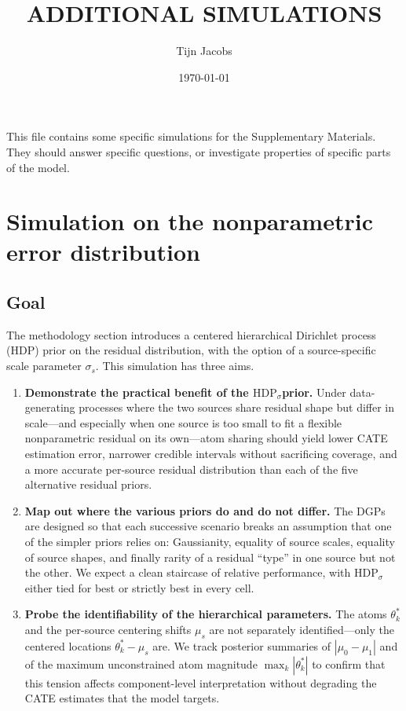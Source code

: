 \documentclass[11pt]{article}
\title{ADDITIONAL SIMULATIONS}
\author{
  Tijn Jacobs}
\date{\today}
\theoremstyle{plain}
\theoremstyle{definition}
\theoremstyle{remark}
\newcommand{\1}{\mathds{1}}
\newcommand{\mHDPs}{\ensuremath{\mathrm{HDP}_\sigma}}
\begin{document}
\maketitle

This file contains some specific simulations for the Supplementary Materials.
They should answer specific questions, or investigate properties of specific parts of the model.



\section{Simulation on the nonparametric error distribution}
\label{sec:sim-error-dist}

\subsection{Goal}
\label{sec:sim-goal}

The methodology section introduces a centered hierarchical Dirichlet
process (HDP) prior on the residual distribution, with the option of a
source-specific scale parameter $\sigma_s$. This simulation has three
aims.

\begin{enumerate}
  \item \textbf{Demonstrate the practical benefit of the
    \mHDPs prior.} Under data-generating processes
    where the two sources share residual shape but differ in
    scale---and especially when one source is too small to fit a
    flexible nonparametric residual on its own---atom sharing should
    yield lower CATE estimation error, narrower credible intervals
    without sacrificing coverage, and a more accurate per-source
    residual distribution than each of the five alternative residual
    priors.
  \item \textbf{Map out where the various priors do and do not
    differ.} The DGPs are designed so that each successive scenario
    breaks an assumption that one of the simpler priors relies on:
    Gaussianity, equality of source scales, equality of source shapes,
    and finally rarity of a residual ``type'' in one source but not the
    other. We expect a clean staircase of relative performance, with
    \mHDPs either tied for best or strictly best
    in every cell.
  \item \textbf{Probe the identifiability of the hierarchical
    parameters.} The atoms $\theta_k^*$ and the per-source centering
    shifts $\mu_s$ are not separately identified---only the centered
    locations $\theta_k^* - \mu_s$ are. We track posterior summaries
    of $|\mu_0 - \mu_1|$ and of the maximum unconstrained atom
    magnitude $\max_k |\theta_k^*|$ to confirm that this tension
    affects component-level interpretation without degrading the
    CATE estimates that the model targets.
\end{enumerate}
\end{document}
